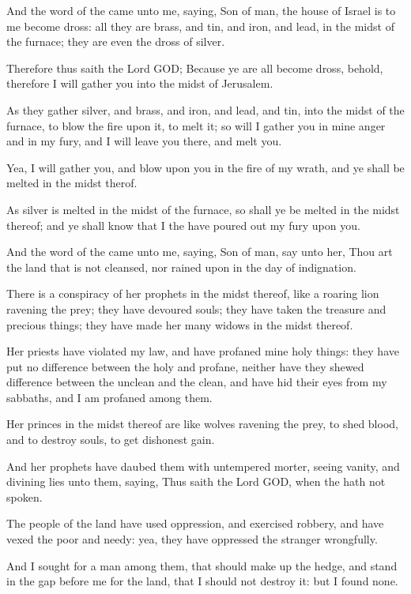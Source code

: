 \Verse And the word of the \LORD came unto me, saying, \Verse Son of man, the house of Israel is to me become dross: all they are brass, and tin, and iron, and lead, in the midst of the furnace; they are even the dross of silver.

\Verse Therefore thus saith the Lord GOD; Because ye are all become dross, behold, therefore I will gather you into the midst of Jerusalem.

\Verse As they gather silver, and brass, and iron, and lead, and tin, into the midst of the furnace, to blow the fire upon it, to melt it; so will I gather you in mine anger and in my fury, and I will leave you there, and melt you.

\Verse Yea, I will gather you, and blow upon you in the fire of my wrath, and ye shall be melted in the midst therof.

\Verse As silver is melted in the midst of the furnace, so shall ye be melted in the midst thereof; and ye shall know that I the \LORD have poured out my fury upon you.

\Verse And the word of the \LORD came unto me, saying, \Verse Son of man, say unto her, Thou art the land that is not cleansed, nor rained upon in the day of indignation.

\Verse There is a conspiracy of her prophets in the midst thereof, like a roaring lion ravening the prey; they have devoured souls; they have taken the treasure and precious things; they have made her many widows in the midst thereof.

\Verse Her priests have violated my law, and have profaned mine holy things: they have put no difference between the holy and profane, neither have they shewed difference between the unclean and the clean, and have hid their eyes from my sabbaths, and I am profaned among them.

\Verse Her princes in the midst thereof are like wolves ravening the prey, to shed blood, and to destroy souls, to get dishonest gain.

\Verse And her prophets have daubed them with untempered morter, seeing vanity, and divining lies unto them, saying, Thus saith the Lord GOD, when the \LORD hath not spoken.

\Verse The people of the land have used oppression, and exercised robbery, and have vexed the poor and needy: yea, they have oppressed the stranger wrongfully.

\Verse And I sought for a man among them, that should make up the hedge, and stand in the gap before me for the land, that I should not destroy it: but I found none.

